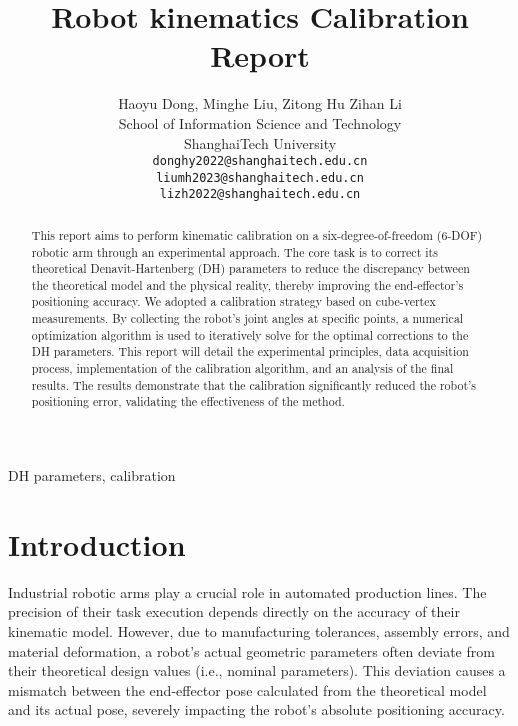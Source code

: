 \documentclass[conference]{IEEEtran}
\begin{document}
\title{Robot kinematics Calibration Report\\

}

\author{Haoyu Dong, Minghe Liu, Zitong Hu Zihan Li\\
	School of Information Science and Technology\\
	ShanghaiTech University\\
	\texttt{donghy2022@shanghaitech.edu.cn} \\
        \texttt{liumh2023@shanghaitech.edu.cn} \\
        \texttt{lizh2022@shanghaitech.edu.cn} \\
        
}

\maketitle

\begin{abstract}
This report aims to perform kinematic calibration on a six-degree-of-freedom (6-DOF) robotic arm through an experimental approach. The core task is to correct its theoretical Denavit-Hartenberg (DH) parameters to reduce the discrepancy between the theoretical model and the physical reality, thereby improving the end-effector's positioning accuracy. We adopted a calibration strategy based on cube-vertex measurements. By collecting the robot's joint angles at specific points, a numerical optimization algorithm is used to iteratively solve for the optimal corrections to the DH parameters. This report will detail the experimental principles, data acquisition process, implementation of the calibration algorithm, and an analysis of the final results. The results demonstrate that the calibration significantly reduced the robot's positioning error, validating the effectiveness of the method.
\end{abstract}

\begin{IEEEkeywords}
 DH parameters, calibration
\end{IEEEkeywords}

\section{Introduction}
Industrial robotic arms play a crucial role in automated production lines. The precision of their task execution depends directly on the accuracy of their kinematic model. However, due to manufacturing tolerances, assembly errors, and material deformation, a robot's actual geometric parameters often deviate from their theoretical design values (i.e., nominal parameters). This deviation causes a mismatch between the end-effector pose calculated from the theoretical model and its actual pose, severely impacting the robot's absolute positioning accuracy.
\end{document}
